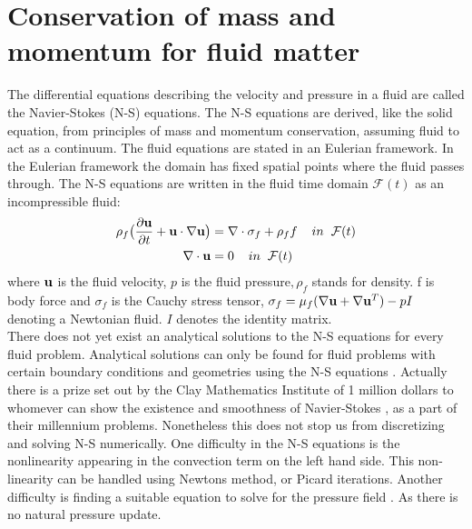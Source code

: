 \section{Conservation of mass and momentum for fluid matter}
The differential equations describing the velocity and pressure in a fluid are called the Navier-Stokes (N-S) equations. The N-S equations are derived, like the solid equation, from principles of mass and momentum conservation, assuming fluid to act as a continuum.
The fluid equations are stated in an Eulerian framework. In the Eulerian framework the domain has fixed spatial points where the fluid passes through. 
The N-S equations are written in the fluid time domain $\mathcal{F}(t)$ as an incompressible fluid:
\begin{align}
\label{eq:NS}
\rho_f\big( \frac{\partial \bold{u}}{\partial t} +  \bold{u} \cdot \nabla \bold{u}\big) &= \nabla \cdot \sigma_f + \rho_ff  \hspace{4mm} in \hspace{2mm} \mathcal{F}(t)\\
\nabla \cdot \bold{u} &= 0 \hspace{4mm} in \hspace{2mm} \mathcal{F}(t)
\end{align}
where $\bold{u}$ is the fluid velocity, $p$ is the fluid pressure$, \rho_f$ stands for density. f is body force and $\sigma_f$ is the Cauchy stress tensor, $ \sigma_f = \mu_f (\nabla \bold{u} + \nabla \bold{u}^T)  - pI$ denoting a Newtonian fluid. $I$ denotes the identity matrix. \\

There does not yet exist an analytical solutions to the N-S equations for every fluid problem. 
Analytical solutions can only be found for fluid problems with certain boundary conditions and geometries using the N-S equations \cite{White2000}. Actually there is a prize set out by the Clay Mathematics Institute of 1 million dollars to whomever can show the existence and smoothness of Navier-Stokes \cite{Fefferman2000}, as a part of their millennium problems. 
Nonetheless this does not stop us from discretizing and solving N-S numerically. One difficulty in the N-S equations is the nonlinearity appearing in the convection term on the left hand side. This non-linearity can be handled using Newtons method, or Picard iterations. Another difficulty is finding a suitable equation to solve for the pressure field \cite{Charlesworth2003}. As there is no natural pressure update. 